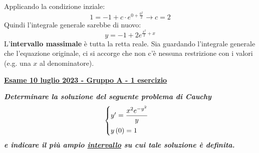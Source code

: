 \documentclass[a4paper]{article}
\newcommand{\definition}[1]{\textcolor{Red3}{\textbf{#1}}}
\newcommand{\example}[1]{\textcolor{Green4}{\textbf{#1}}}
\begin{document}
	Applicando la condizione inziale:
	\begin{equation*}
		1 = -1 + c \cdot e^{0+\frac{0^{2}}{2}} \longrightarrow c = 2
	\end{equation*}
	Quindi l'integrale generale sarebbe di nuovo:
	\begin{equation*}
		y = - 1 + 2e^{\frac{x^{2}}{2} + x}
	\end{equation*}
	L'\textbf{intervallo massimale} è tutta la retta reale. Sia guardando l'integrale generale che l'equazione originale, ci si accorge che non c'è nessuna restrizione con i valori (e.g. una $x$ al denominatore).\newpage

	\begin{flushleft}
		\label{exam: esame 10 luglio 2023 - Gruppo A - 1 esercizio}
		\hypertarget{
			exam: esame 10 luglio 2023 - Gruppo A - 1 esercizio
		}{
			\definition{\underline{Esame 10 luglio 2023 - Gruppo A - 1 esercizio}}
		}
	\end{flushleft}
	\example{\emph{Determinare la soluzione del seguente problema di Cauchy}
	\begin{equation*}
		\begin{cases}
			y' = \dfrac{x^{2} e^{-y^{2}}}{y} \vspace{.3em}\\
			y\left(0\right) = 1
		\end{cases}
	\end{equation*}
	\emph{e indicare il più ampio \underline{intervallo} su cui tale soluzione è definita.}}\newline
\end{document}
